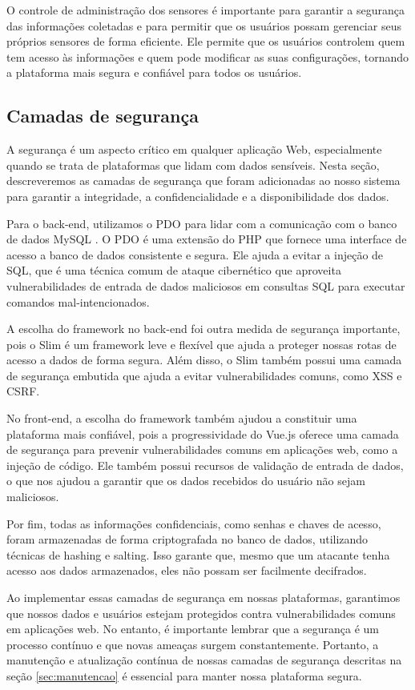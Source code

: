\documentclass[tcc,capa]{texufpel}
\begin{document}
O controle de administração dos sensores é importante para garantir a segurança das informações coletadas e para permitir que os usuários possam gerenciar seus próprios sensores de forma eficiente. Ele permite que os usuários controlem quem tem acesso às informações e quem pode modificar as suas configurações, tornando a plataforma mais segura e confiável para todos os usuários.
\subsection{Camadas de segurança}
A segurança é um aspecto crítico em qualquer aplicação Web, especialmente quando se trata de plataformas que lidam com dados sensíveis. Nesta seção, descreveremos as camadas de segurança que foram adicionadas ao nosso sistema para garantir a integridade, a confidencialidade e a disponibilidade dos dados.

Para o back-end, utilizamos o PDO \cite{PDO:2022} para lidar com a comunicação com o banco de dados MySQL \cite{mysql:2022}. O PDO é uma extensão do PHP \cite{PHP:2022} que fornece uma interface de acesso a banco de dados consistente e segura. Ele ajuda a evitar a injeção de SQL, que é uma técnica comum de ataque cibernético que aproveita vulnerabilidades de entrada de dados maliciosos em consultas SQL para executar comandos mal-intencionados.

A escolha do framework no back-end foi outra medida de segurança importante, pois o Slim \cite{slim:2023} é um framework leve e flexível que ajuda a proteger nossas rotas de acesso a dados de forma segura. Além disso, o Slim também possui uma camada de segurança embutida que ajuda a evitar vulnerabilidades comuns, como XSS e CSRF.

No front-end, a escolha do framework também ajudou a constituir uma plataforma mais confiável, pois a progressividade do Vue.js oferece uma camada de segurança para prevenir vulnerabilidades comuns em aplicações web, como a injeção de código. Ele também possui recursos de validação de entrada de dados, o que nos ajudou a garantir que os dados recebidos do usuário não sejam maliciosos.

Por fim, todas as informações confidenciais, como senhas e chaves de acesso, foram armazenadas de forma criptografada no banco de dados, utilizando técnicas de hashing e salting. Isso garante que, mesmo que um atacante tenha acesso aos dados armazenados, eles não possam ser facilmente decifrados.

Ao implementar essas camadas de segurança em nossas plataformas, garantimos que nossos dados e usuários estejam protegidos contra vulnerabilidades comuns em aplicações web. No entanto, é importante lembrar que a segurança é um processo contínuo e que novas ameaças surgem constantemente. Portanto, a manutenção e atualização contínua de nossas camadas de segurança descritas na seção \ref{sec:manutencao} é essencial para manter nossa plataforma segura.
\end{document}
